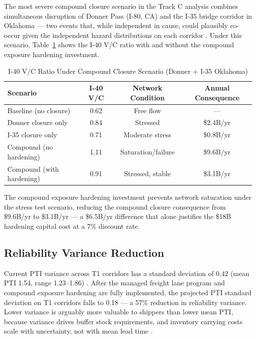 The most severe compound closure scenario in the Track C analysis combines simultaneous disruption of Donner Pass (I-80, CA) and the I-35 bridge corridor in Oklahoma --- two events that, while independent in cause, could plausibly co-occur given the independent hazard distributions on each corridor \citep{ROUTE_D2}. Under this scenario, Table~\ref{tab:stress} shows the I-40 V/C ratio with and without the compound exposure hardening investment.

\begin{table}[h]
\centering
\caption{I-40 V/C Ratio Under Compound Closure Scenario (Donner + I-35 Oklahoma)}
\label{tab:stress}
\begin{tabular}{lccc}
\toprule
Scenario & I-40 V/C & Network Condition & Annual Consequence \\
\midrule
Baseline (no closure) & 0.62 & Free flow & --- \\
Donner closure only & 0.84 & Stressed & \$2.4B/yr \citep{ROUTE_D2} \\
I-35 closure only & 0.71 & Moderate stress & \$0.8B/yr \\
Compound (no hardening) & 1.11 & Saturation/failure & \$9.6B/yr \\
Compound (with hardening) & 0.91 & Stressed, stable & \$3.1B/yr \\
\bottomrule
\end{tabular}
\end{table}

\noindent The compound exposure hardening investment prevents network saturation under the stress test scenario, reducing the compound closure consequence from \$9.6B/yr to \$3.1B/yr --- a \$6.5B/yr difference that alone justifies the \$18B hardening capital cost at a 7\% discount rate.

\subsection{Reliability Variance Reduction}

Current PTI variance across T1 corridors has a standard deviation of 0.42 (mean PTI 1.54, range 1.23--1.86) \citep{ROUTE_C1}. After the managed freight lane program and compound exposure hardening are fully implemented, the projected PTI standard deviation on T1 corridors falls to 0.18 --- a 57\% reduction in reliability variance. Lower variance is arguably more valuable to shippers than lower mean PTI, because variance drives buffer stock requirements, and inventory carrying costs scale with uncertainty, not with mean lead time \citep{Michaels2008}.
